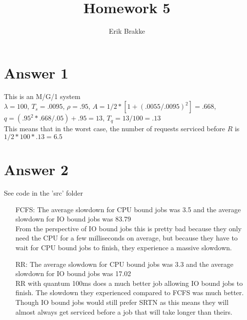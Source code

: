 \documentclass[11pt]{article}
\theoremstyle{definition}
\begin{document}
\title{Homework 5}
\author{Erik Brakke}
\maketitle

\thispagestyle{fancy}
 
 
\section*{Answer 1}
This is an M/G/1 system\\
$\lambda = 100$, $T_s = .0095$, $\rho = .95$, $A = 1/2 * [1 + (.0055 / .0095)^2] = .668$, $q = (.95^2 * .668 / .05) + .95 = 13$, $T_q = 13 / 100 = .13$\\
This means that in the worst case, the number of requests serviced before $R$ is $1/2 * 100 * .13 = 6.5$

\section*{Answer 2}
See code in the 'src' folder
\begin{enumerate}
	\item[FCFS:] The average slowdown for CPU bound jobs was 3.5 and the average slowdown for IO bound jobs was 83.79\\
	From the perspective of IO bound jobs this is pretty bad because they only need the CPU for a few milliseconds on average, but because they have to wait
	for CPU bound jobs to finish, they experience a massive slowdown.
	
	\item[RR: ] The average slowdown for CPU bound jobs was 3.3 and the average slowdown for IO bound jobs was 17.02\\
	RR with quantum 100ms does a much better job allowing IO bound jobs to finish.  The slowdown they experienced compared to FCFS was much better.  Though IO bound jobs
	would still prefer SRTN as this means they will almost always get serviced before a job that will take longer than theirs.
\end{enumerate}
\end{document}
